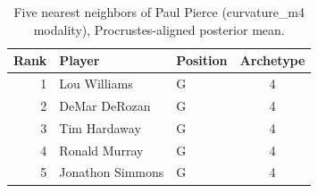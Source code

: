 \begin{table}[htbp]
  \centering\small
  \begin{tabular}{rllc}
    \toprule
    Rank & Player & Position & Archetype \\
    \midrule
    1 & Lou Williams & G & 4 \\
    2 & DeMar DeRozan & G & 4 \\
    3 & Tim Hardaway & G & 4 \\
    4 & Ronald Murray & G & 4 \\
    5 & Jonathon Simmons & G & 4 \\
    \bottomrule
  \end{tabular}
  \caption{Five nearest neighbors of Paul Pierce (curvature_m4 modality), Procrustes-aligned posterior mean.}
  \label{tab:Paul_Pierce_neighbors_curvature_m4}
\end{table}

